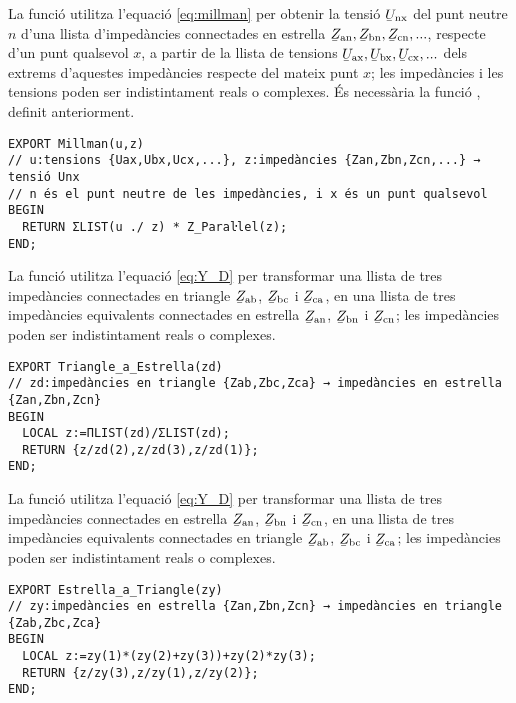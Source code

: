 La funció  utilitza l'equació \eqref{eq:millman} per obtenir la tensió $\cmplx{U}\ped{nx}$ del punt neutre $n$ d'una llista d'impedàncies connectades en estrella $\cmplx{Z}\ped{an}, \cmplx{Z}\ped{bn}, \cmplx{Z}\ped{cn}, ...$, respecte d'un punt qualsevol $x$, a partir de la llista de tensions $\cmplx{U}\ped{ax}, \cmplx{U}\ped{bx}, \cmplx{U}\ped{cx}, ...$ dels extrems d'aquestes impedàncies respecte del mateix punt $x$; les impedàncies i les tensions poden ser indistintament reals o complexes. És necessària la funció , definit anteriorment.

\begin{lstlisting}[caption={HP Prime --- Funció Millman}]
EXPORT Millman(u,z)
// u:tensions {Uax,Ubx,Ucx,...}, z:impedàncies {Zan,Zbn,Zcn,...} → tensió Unx
// n és el punt neutre de les impedàncies, i x és un punt qualsevol
BEGIN
  RETURN ΣLIST(u ./ z) * Z_Paraŀlel(z);
END;
\end{lstlisting}

La funció  utilitza l'equació \eqref{eq:Y_D} per transformar una llista de tres impedàncies connectades en triangle $\cmplx{Z}\ped{ab}$, $\cmplx{Z}\ped{bc}$ i  $\cmplx{Z}\ped{ca}$, en una llista de tres impedàncies equivalents connectades en estrella $\cmplx{Z}\ped{an}$, $\cmplx{Z}\ped{bn}$ i $\cmplx{Z}\ped{cn}$; les impedàncies poden ser indistintament reals o complexes.

\begin{lstlisting}[caption={HP Prime --- Funció Triangle\_a\_Estrella}]
EXPORT Triangle_a_Estrella(zd)
// zd:impedàncies en triangle {Zab,Zbc,Zca} → impedàncies en estrella {Zan,Zbn,Zcn}
BEGIN
  LOCAL z:=ΠLIST(zd)/ΣLIST(zd);
  RETURN {z/zd(2),z/zd(3),z/zd(1)};
END;
\end{lstlisting}

La funció  utilitza l'equació \eqref{eq:Y_D} per transformar una llista de tres impedàncies connectades en estrella $\cmplx{Z}\ped{an}$, $\cmplx{Z}\ped{bn}$ i $\cmplx{Z}\ped{cn}$, en una llista de tres impedàncies equivalents connectades en triangle $\cmplx{Z}\ped{ab}$, $\cmplx{Z}\ped{bc}$ i  $\cmplx{Z}\ped{ca}$; les impedàncies poden ser indistintament reals o complexes.

\begin{lstlisting}[caption={HP Prime --- Funció Estrella\_a\_Triangle}]
EXPORT Estrella_a_Triangle(zy)
// zy:impedàncies en estrella {Zan,Zbn,Zcn} → impedàncies en triangle {Zab,Zbc,Zca}
BEGIN
  LOCAL z:=zy(1)*(zy(2)+zy(3))+zy(2)*zy(3);
  RETURN {z/zy(3),z/zy(1),z/zy(2)};
END;
\end{lstlisting}

